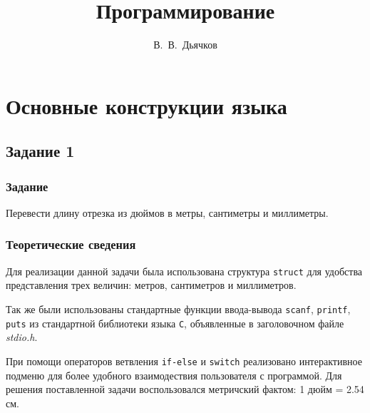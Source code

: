 \documentclass[12pt,a4paper]{report}
\author{В.~В.~Дьячков}
\title{Программирование}
\begin{document}
\listoftodos
\maketitle
\chapter{Основные конструкции языка}
\section{Задание 1}
\subsection{Задание}

Перевести длину отрезка из дюймов в метры, сантиметры и миллиметры.

\subsection{Теоретические сведения}
\hspace{\parindent}Для реализации данной задачи была использована структура \texttt{struct} для удобства представления трех величин: метров, сантиметров и миллиметров. 

Так же были использованы стандартные функции ввода-вывода \texttt{scanf}, \texttt{printf}, \texttt{puts} из стандартной библиотеки языка \verb+С+, объявленные в заголовочном файле \textit{stdio.h}.

При помощи операторов ветвления \texttt{if-else} и \texttt{switch} реализовано интерактивное подменю для более удобного взаимодествия пользователя с программой.
Для решения поставленной задачи воспользовался метричский фактом: 1 дюйм = 2.54 см.
\end{document}
